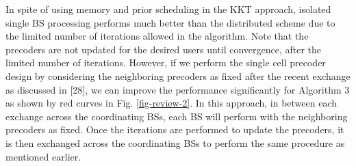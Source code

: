 \begin{enumerate}
	In spite of using memory and prior scheduling in the \ac{KKT} approach, isolated single \ac{BS} processing performs much better than the distributed scheme due to the limited number of iterations allowed in the algorithm. Note that the precoders are not updated for the desired users until convergence, after the limited number of iterations. However, if we perform the single cell precoder design by considering the neighboring precoders as fixed after the recent exchange as discussed in [28], we can improve the performance significantly for Algorithm 3 as shown by red curves in Fig. \ref{fig-review-2}. In this approach, in between each exchange across the coordinating \acp{BS}, each \ac{BS} will perform  with the neighboring precoders as fixed. Once the iterations are performed to update the precoders, it is then exchanged across the coordinating \acp{BS} to perform the same procedure as mentioned earlier. 

 


\end{enumerate}
